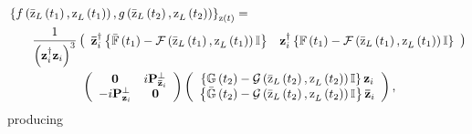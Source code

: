 \documentclass[aps,preprint]{revtex4}%
\begin{document}
\begin{align}
&  \left\{  f\left(  \mathrm{\bar{z}}_{L}\left(  t_{1}\right)  \mathrm{,z}%
_{L}\left(  t_{1}\right)  \right)  ,g\left(  \mathrm{\bar{z}}_{L}\left(
t_{2}\right)  \mathrm{,z}_{L}\left(  t_{2}\right)  \right)  \right\}
_{\mathrm{z}\left(  t\right)  }=\nonumber\\
&  \qquad\frac{1}{\left(  \mathbf{z}_{i}^{\dagger}\mathbf{z}_{i}\right)  ^{3}%
}\left(
\begin{array}
[c]{cc}%
\mathbf{\bar{z}}_{i}^{\dagger}\left\{  \mathbb{\bar{F}}\left(  t_{1}\right)
-\mathcal{F}\left(  \mathrm{\bar{z}}_{L}\left(  t_{1}\right)  \mathrm{,z}%
_{L}\left(  t_{1}\right)  \right)  \mathbb{I}\right\}  & \mathbf{z}%
_{i}^{\dagger}\left\{  \mathbb{F}\left(  t_{1}\right)  -\mathcal{F}\left(
\mathrm{\bar{z}}_{L}\left(  t_{1}\right)  \mathrm{,z}_{L}\left(  t_{1}\right)
\right)  \mathbb{I}\right\}
\end{array}
\right) \nonumber\\
&  \qquad\qquad\qquad\left(
\begin{array}
[c]{cc}%
\mathbf{0} & i\mathbf{P}_{\mathbf{\bar{z}}_{i}}^{\bot}\\
-i\mathbf{P}_{\mathbf{z}_{i}}^{\bot} & \mathbf{0}%
\end{array}
\right)  \left(
\begin{array}
[c]{c}%
\left\{  \mathbb{G}\left(  t_{2}\right)  -\mathcal{G}\left(  \mathrm{\bar{z}%
}_{L}\left(  t_{2}\right)  \mathrm{,z}_{L}\left(  t_{2}\right)  \right)
\mathbb{I}\right\}  \mathbf{z}_{i}\\
\left\{  \mathbb{\bar{G}}\left(  t_{2}\right)  -\mathcal{G}\left(
\mathrm{\bar{z}}_{L}\left(  t_{2}\right)  \mathrm{,z}_{L}\left(  t_{2}\right)
\right)  \mathbb{I}\right\}  \mathbf{\bar{z}}_{i}%
\end{array}
\right)  ,
\end{align}
producing
\end{document}
